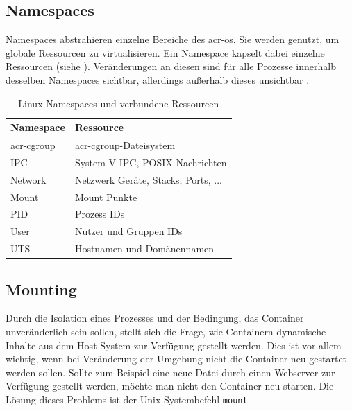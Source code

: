 \subsection{Namespaces}
\label{sec:namespaces}
Namespaces abstrahieren einzelne Bereiche des \gls{acr-os}. Sie werden genutzt, um globale Ressourcen zu virtualisieren. Ein Namespace kapselt dabei einzelne Ressourcen (siehe ). Veränderungen an diesen sind für alle Prozesse innerhalb desselben Namespaces sichtbar, allerdings außerhalb dieses unsichtbar \citep{Namespaces7LinuxManualPage}.

\begin{table}[h]
	\begin{center}
		\begin{tabu} to 0.9
			\toprule
			Namespace			& Ressource				 				\\
			\midrule
			\Gls{acr-cgroup}	& \Gls{acr-cgroup}-Dateisystem 			\\
			IPC					& System V IPC, POSIX Nachrichten 		\\
			Network				& Netzwerk Geräte, Stacks, Ports, ...	\\
			Mount				& Mount Punkte							\\
			PID					& Prozess IDs							\\
			User				& Nutzer und Gruppen IDs				\\
			UTS					& Hostnamen und Domänennamen			\\
			\bottomrule
		\end{tabu}
	\end{center}
	\caption{Linux Namespaces und verbundene Ressourcen \citep{Namespaces7LinuxManualPage}}
	\label{tab:namespaces}
\end{table}

\subsection{Mounting}
\label{sec:mount}
Durch die Isolation eines Prozesses und der Bedingung, das Container unveränderlich sein sollen, stellt sich die Frage, wie Containern dynamische Inhalte aus dem Host-System zur Verfügung gestellt werden. Dies ist vor allem wichtig, wenn bei Veränderung der Umgebung nicht die Container neu gestartet werden sollen. Sollte zum Beispiel eine neue Datei durch einen Webserver zur Verfügung gestellt werden, möchte man nicht den Container neu starten. Die Lösung dieses Problems ist der Unix-Systembefehl \texttt{mount}. 


